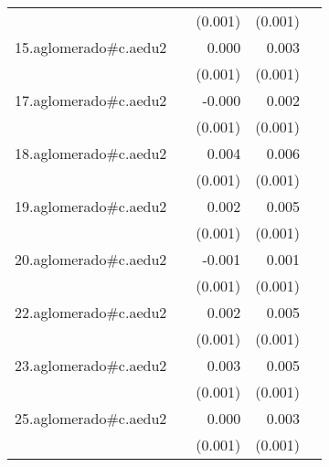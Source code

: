 {\begin{longtable}{l*{4}{D{.}{.}{-1}}}
            &                     &     (0.001)         &     (0.001)         &                     \\
\addlinespace
15.aglomerado#c.aedu2&                     &       0.000         &       0.003\sym{**} &                     \\
            &                     &     (0.001)         &     (0.001)         &                     \\
\addlinespace
17.aglomerado#c.aedu2&                     &      -0.000         &       0.002\sym{*}  &                     \\
            &                     &     (0.001)         &     (0.001)         &                     \\
\addlinespace
18.aglomerado#c.aedu2&                     &       0.004\sym{**} &       0.006\sym{***}&                     \\
            &                     &     (0.001)         &     (0.001)         &                     \\
\addlinespace
19.aglomerado#c.aedu2&                     &       0.002\sym{*}  &       0.005\sym{***}&                     \\
            &                     &     (0.001)         &     (0.001)         &                     \\
\addlinespace
20.aglomerado#c.aedu2&                     &      -0.001         &       0.001         &                     \\
            &                     &     (0.001)         &     (0.001)         &                     \\
\addlinespace
22.aglomerado#c.aedu2&                     &       0.002         &       0.005\sym{***}&                     \\
            &                     &     (0.001)         &     (0.001)         &                     \\
\addlinespace
23.aglomerado#c.aedu2&                     &       0.003\sym{*}  &       0.005\sym{***}&                     \\
            &                     &     (0.001)         &     (0.001)         &                     \\
\addlinespace
25.aglomerado#c.aedu2&                     &       0.000         &       0.003\sym{**} &                     \\
            &                     &     (0.001)         &     (0.001)         &                     \\

\end{longtable}}
